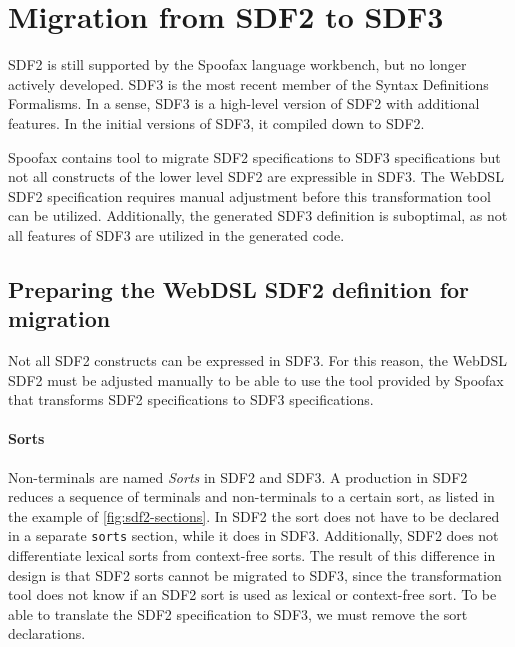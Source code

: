   \section{\label{sec:sdf2-to-sdf3}Migration from SDF2 to SDF3}

    SDF2 is still supported by the Spoofax language workbench, but no longer actively developed. SDF3 is the most recent member of the Syntax Definitions Formalisms. In a sense, SDF3 is a high-level version of SDF2 with additional features. In the initial versions of SDF3, it compiled down to SDF2.

    Spoofax contains tool to migrate SDF2 specifications to SDF3 specifications but not all constructs of the lower level SDF2 are expressible in SDF3. The WebDSL SDF2 specification requires manual adjustment before this transformation tool can be utilized. Additionally, the generated SDF3 definition is suboptimal, as not all features of SDF3 are utilized in the generated code.

    \subsection{\label{subsec:preparing-webdsl-sdf2}Preparing the WebDSL SDF2 definition for migration}

      Not all SDF2 constructs can be expressed in SDF3. For this reason, the WebDSL SDF2 must be adjusted manually to be able to use the tool provided by Spoofax that transforms SDF2 specifications to SDF3 specifications.

      \paragraph{Sorts} Non-terminals are named \textit{Sorts} in SDF2 and SDF3. A production in SDF2 reduces a sequence of terminals and non-terminals to a certain sort, as listed in the example of \cref{fig:sdf2-sections}. In SDF2 the sort does not have to be declared in a separate \texttt{sorts} section, while it does in SDF3. Additionally, SDF2 does not differentiate lexical sorts from context-free sorts. The result of this difference in design is that SDF2 sorts cannot be migrated to SDF3, since the transformation tool does not know if an SDF2 sort is used as lexical or context-free sort. To be able to translate the SDF2 specification to SDF3, we must remove the sort declarations.

